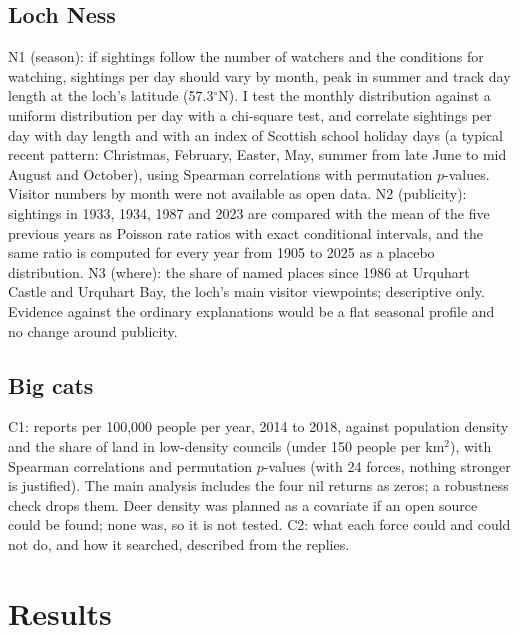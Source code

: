 \documentclass[11pt,a4paper]{article}
\begin{document}
\subsection{Loch Ness}
N1 (season): if sightings follow the number of watchers and the conditions for watching, sightings per day should vary by month, peak in summer and track day length at the loch's latitude (57.3$^\circ$N). I test the monthly distribution against a uniform distribution per day with a chi-square test, and correlate sightings per day with day length and with an index of Scottish school holiday days (a typical recent pattern: Christmas, February, Easter, May, summer from late June to mid August and October), using Spearman correlations with permutation $p$-values. Visitor numbers by month were not available as open data. N2 (publicity): sightings in 1933, 1934, 1987 and 2023 are compared with the mean of the five previous years as Poisson rate ratios with exact conditional intervals, and the same ratio is computed for every year from 1905 to 2025 as a placebo distribution. N3 (where): the share of named places since 1986 at Urquhart Castle and Urquhart Bay, the loch's main visitor viewpoints; descriptive only. Evidence against the ordinary explanations would be a flat seasonal profile and no change around publicity.

\subsection{Big cats}
C1: reports per 100,000 people per year, 2014 to 2018, against population density and the share of land in low-density councils (under 150 people per km$^2$), with Spearman correlations and permutation $p$-values (with 24 forces, nothing stronger is justified). The main analysis includes the four nil returns as zeros; a robustness check drops them. Deer density was planned as a covariate if an open source could be found; none was, so it is not tested. C2: what each force could and could not do, and how it searched, described from the replies.

\section{Results}\label{sec:results}
\end{document}
